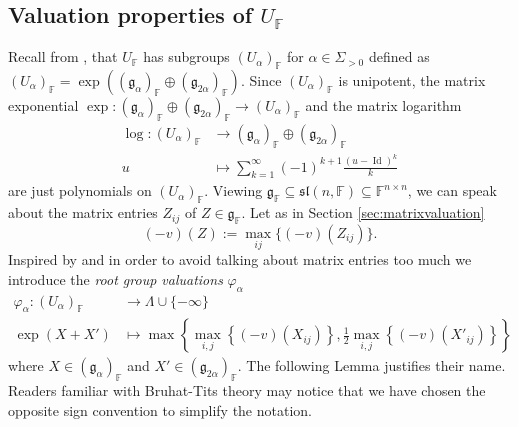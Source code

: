 \documentclass[12pt]{amsart}
\newcommand{\F}{\mathbb{F} }
\newcommand{\frakg}{\mathfrak{g}}
\numberwithin{equation}{section}
\theoremstyle{remark} %
\begin{document}
\subsection{Valuation properties of \texorpdfstring{$U_\F$}{U(F)}} \label{sec:root_group_valuation}

Recall from \cite[Section \ref{I-sec:U}]{AppAGRCF}, that $U_\F$ has subgroups $(U_\alpha)_\F$ for $\alpha \in \Sigma_{>0}$ defined as $(U_\alpha)_\F = \exp((\frakg_\alpha)_\F \oplus (\frakg_{2\alpha})_\F)$. Since $(U_\alpha)_\F$ is unipotent, the matrix exponential $\exp \colon (\frakg_\alpha)_\F \oplus (\frakg_{2\alpha})_\F \to (U_\alpha)_\F$ and the matrix logarithm 
\begin{align*}
	\log \colon (U_\alpha)_\F &\to (\frakg_\alpha)_\F \oplus (\frakg_{2\alpha})_\F \\
	u & \mapsto \sum_{k=1}^\infty (-1)^{k+1} \frac{(u-\operatorname{Id})^k}{k}
\end{align*}
are just polynomials on $(U_\alpha)_\F$. Viewing $\frakg_\F \subseteq \mathfrak{sl}(n ,\F) \subseteq \F^{n\times n}$, we can speak about the matrix entries $Z_{ij}$ of $Z \in \frakg_\F$. Let as in Section \ref{sec:matrixvaluation}
$$
(-v)(Z) := \max_{ij} \{ (-v)(Z_{ij}) \}.
$$
Inspired by \cite[6.2]{BrTi} and in order to avoid talking about matrix entries too much we introduce the \emph{root group valuations} $\varphi_\alpha$
\begin{align*}
	\varphi_\alpha \colon (U_{\alpha})_\F &\to \Lambda  \cup \{ -\infty \}\\
	\exp(X+X') & \mapsto \max \left\{ \max_{i,j} \left\{(-v)(X_{ij}) \right\}, \frac{1}{2} \max_{i,j} \left\{ (-v)(X'_{ij}) \right\}\right\}
\end{align*}
where $X \in (\frakg_\alpha)_\F$ and $X' \in (\frakg_{2\alpha})_\F$. The following Lemma justifies their name. Readers familiar with Bruhat-Tits theory may notice that we have chosen the opposite sign convention to simplify the notation.
\end{document}
